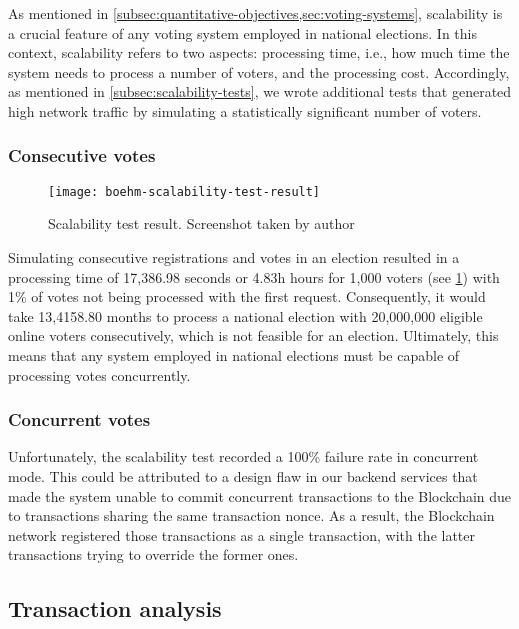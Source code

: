 As mentioned in \cref{subsec:quantitative-objectives,sec:voting-systems}, scalability is a crucial feature of any voting system employed in national elections.
In this context, scalability refers to two aspects: processing time, i.e., how much time the system needs to process a number of voters, and the processing cost.
Accordingly, as mentioned in \cref{subsec:scalability-tests}, we wrote additional tests that generated high network traffic by simulating a statistically significant number of voters.

\subsubsection{Consecutive votes}\label{subsubsec:res-consecutive-votes}

\begin{figure}[h]
    \centering
    \texttt{[image: boehm-scalability-test-result]}
    \caption[Scalability test result]{Scalability test result. Screenshot taken by author}
    \label{fig:scalability-test-result}
\end{figure}

Simulating consecutive registrations and votes in an election resulted in a processing time of 17,386.98 seconds or 4.83h hours for 1,000 voters (see \cref{fig:scalability-test-result}) with 1\% of votes not being processed with the first request.
Consequently, it would take 13,4158.80 months to process a national election with 20,000,000 eligible online voters consecutively, which is not feasible for an election.
Ultimately, this means that any system employed in national elections must be capable of processing votes concurrently.

\subsubsection{Concurrent votes}\label{subsubsec:res-concurrent-votes}

Unfortunately, the scalability test recorded a 100\% failure rate in concurrent mode.
This could be attributed to a design flaw in our backend services that made the system unable to commit concurrent transactions to the \gls{Blockchain} due to transactions sharing the same transaction nonce.
As a result, the \gls{Blockchain} network registered those transactions as a single transaction, with the latter transactions trying to override the former ones.

\subsection{Transaction analysis}\label{subsec:res-transaction-analysis}

